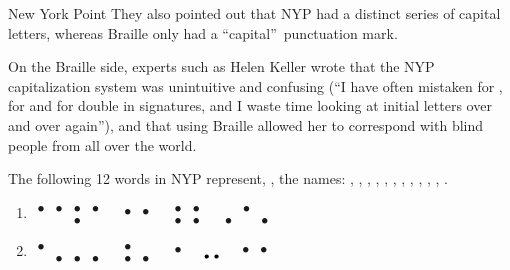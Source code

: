 \begin{refsection}
\begin{problem}{New York Point}{\namePLittell}{}
\noindent They also pointed out that NYP had a distinct series of capital letters, whereas Braille only had a “capital”\ punctuation mark. 

On the Braille side, experts such as Helen Keller wrote that the NYP capitalization system was unintuitive and confusing (“I have often mistaken  for ,  for  and  for double  in signatures, and I waste time looking at initial letters over and over again”), and that using Braille allowed her to correspond with blind people from all over the world.

The following 12 words in NYP represent, \OlympiadRandomOrder{}, the names: , , , , , , , , , , , . \\

\begin{multicols}{2}
\begin{enumerate}
    \item {\Large \boldmath$\begin{smallmatrix} 
    \bullet & \bullet & \bullet & \bullet \\  & & \bullet &
\end{smallmatrix}$\ \ $\begin{smallmatrix}
  \bullet & \bullet \\  & 
\end{smallmatrix}$\ \ $\begin{smallmatrix}
  \bullet & \bullet \\ \bullet & \bullet
\end{smallmatrix}$\ \ $\begin{smallmatrix}
  & \bullet &  \\ \bullet& & \bullet
\end{smallmatrix}$}

    \item {\Large \boldmath$\begin{smallmatrix} 
    \bullet &  &  &  \\  &\bullet&\bullet & \bullet 
\end{smallmatrix}$\ \ $\begin{smallmatrix}
  \bullet &  \\  \bullet& \bullet
\end{smallmatrix}$\ \ $\begin{smallmatrix}
  \bullet  \\ \,
\end{smallmatrix}$\ \ $\begin{smallmatrix}
  & \vphantom{\bullet}\\ \bullet & \bullet
\end{smallmatrix}$\ \ $\begin{smallmatrix}
  \bullet & \bullet  \\ & 
\end{smallmatrix}$}


\end{enumerate}
\end{multicols}
\end{problem}
\end{refsection}
